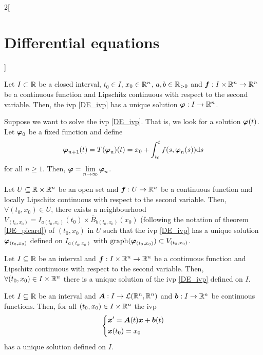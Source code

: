 \documentclass[../../../main.tex]{subfiles}
\begin{document}
\begin{multicols}{2}[\section{Differential equations}]
\begin{theorem}
  \end{theorem}
  \begin{prop}
    Let $I\subset \mathbb{R}$ be a closed interval, $t_0\in I$, $x_0\in\mathbb{R}^n$, $a,b\in\mathbb{R}_{>0}$ and $\boldsymbol{f}:I\times\mathbb{R}^n\rightarrow\mathbb{R}^n$ be a continuous function and Lipschitz continuous with respect to the second variable. Then, the ivp \eqref{DE_ivp} has a unique solution $\boldsymbol{\varphi}:I\rightarrow\mathbb{R}^n$.
  \end{prop}
  \begin{corollary}
    Suppose we want to solve the ivp \eqref{DE_ivp}. That is, we look for a solution $\boldsymbol{\varphi}(t)$. Let $\boldsymbol{\varphi}_0$ be a fixed function and define
    $$\boldsymbol{\varphi}_{n+1}(t)=T(\boldsymbol{\varphi}_n)(t)=x_0+\int_{t_0}^tf(s,\boldsymbol{\varphi}_n(s))\dd s$$
    for all $n\geq 1$. Then, $\displaystyle\boldsymbol{\varphi}=\lim_{n\to\infty}\boldsymbol{\varphi}_n$.
  \end{corollary}
  \begin{corollary}
    Let $U\subseteq\mathbb{R}\times\mathbb{R}^n$ be an open set and $\boldsymbol{f}:U\rightarrow\mathbb{R}^n$ be a continuous function and locally Lipschitz continuous with respect to the second variable. Then, $\forall(t_0,x_0)\in U$, there exists a neighbourhood $V_{(t_0,x_0)}=I_{a(t_0,x_0)}(t_0)\times\overline{B}_{b(t_0,x_0)}(x_0)$ (following the notation of theorem \ref{DE_picard}) of $(t_0,x_0)$ in $U$ such that the ivp \eqref{DE_ivp} has a unique solution $\boldsymbol{\varphi}_{(t_0,x_0)}$ defined on $I_{a(t_0,x_0)}$ with $\operatorname{graph}(\boldsymbol{\varphi}_{(t_0,x_0)})\subset V_{(t_0,x_0)}$.
  \end{corollary}
  \begin{prop}
    Let $I\subseteq\mathbb{R}$ be an interval and $\boldsymbol{f}:I\times\mathbb{R}^n\rightarrow\mathbb{R}^n$ be a continuous function and Lipschitz continuous with respect to the second variable. Then, $\forall(t_0,x_0)\in I\times\mathbb{R}^n$ there is a unique solution of the ivp \eqref{DE_ivp} defined on $I$.
  \end{prop}
  \begin{corollary}
    Let $I\subseteq\mathbb{R}$ be an interval and $\boldsymbol{A}:I\rightarrow\mathcal{L}(\mathbb{R}^n,\mathbb{R}^n)$ and $\boldsymbol{b}:I\rightarrow\mathbb{R}^n$ be continuous functions. Then, for all $(t_0,x_0)\in I\times\mathbb{R}^n$ the ivp
    $$
      \left\{
      \begin{aligned}
         & \boldsymbol{x}'=\boldsymbol{A}(t)\boldsymbol{x}+\boldsymbol{b}(t) \\
         & \boldsymbol{x}(t_0)=x_0
      \end{aligned}
      \right.
    $$
    has a unique solution defined on $I$.
  \end{corollary}

\end{multicols}
\end{document}
